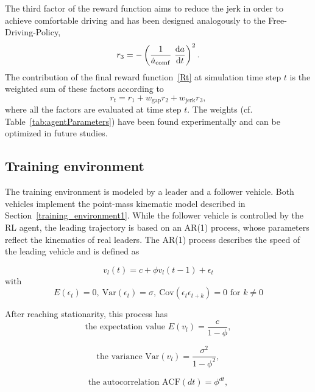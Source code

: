 \documentclass[review]{elsarticle}
\providecommand{\sub}[1]{_{\mathrm{#1}}}  %
\providecommand{\3}{{\ss}}
\begin{document}
The third factor of the reward function aims to reduce the jerk in
order to achieve comfortable driving and has been designed analogously to the Free-Driving-Policy, 
\begin{equation}
r_3 = -\left(\frac{1}{\dot{a}\sub{comf}} \ \dv{a}{t}\right)^2.
\end{equation}
%
The contribution of the final reward function~\eqref{Rt}  at simulation time step $t$ is the weighted
sum of these factors according to
\begin{equation}
\label{rt2}
r_t = r_1 + w\sub{gap}r_2+w\sub{jerk}r_3,
\end{equation}
where all the factors are evaluated at time step $t$. The weights (cf.
Table~\ref{tab:agentParameters}) have been found experimentally and
can be optimized in future studies.





\subsection{Training environment}
The training environment is modeled by a leader and a follower vehicle. Both vehicles implement the point-mass kinematic model described in Section~\ref{training_environment1}. While the follower vehicle is controlled by the RL agent, the  leading trajectory is based on an AR(1) process, whose parameters
reflect the kinematics of real leaders. The AR(1) process describes
the speed of the leading vehicle and is defined as 

\begin{equation} \label{eq:AR1}
v_l(t) = c+\phi v_l(t-1)+ \epsilon_t
\end{equation}
with
\begin{equation}
E(\epsilon_t) = 0, \ \text{Var}(\epsilon_t) = \sigma, \ 
\text{Cov}(\epsilon_t\epsilon_{t+k})=0 \text{ for }k\neq 0
\end{equation}

After reaching stationarity, this process has 
\begin{equation}
\label{eq:E_AR1}
\text{the expectation value }E(v_l) = \frac{c}{1-\phi}, 
\end{equation}

\begin{equation}
\label{eq:V_AR1}
\text{the variance }\text{Var}(v_l) = \frac{\sigma^2}{1-\phi^2}, 
\end{equation}

\begin{equation}
\label{eq:ACF_AR1}
\text{the autocorrelation  }\text{ACF}(dt) = \phi^{dt}, 
\end{equation}
\end{document}

